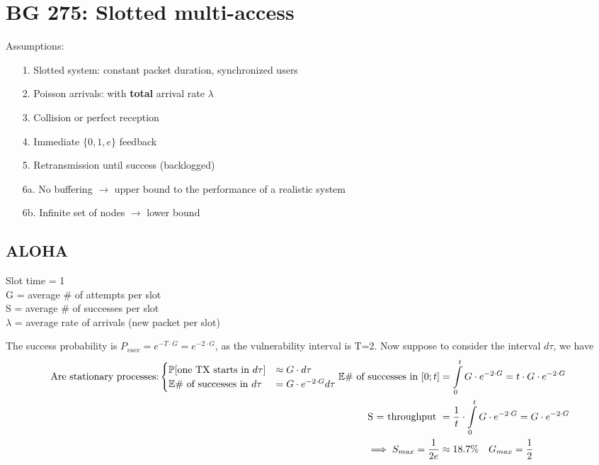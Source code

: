 \section{BG 275: Slotted multi-access}
Assumptions:
\begin{itemize}
  \item[1.] Slotted system: constant packet duration, synchronized users
  \item[2.] Poisson arrivals: with \textbf{total} arrival rate $\lambda$
  \item[3.] Collision or perfect reception
  \item[4.] Immediate $ \{ 0,1, e\}$ feedback
  \item[5.] Retransmission until success (backlogged)
  \item[6a.] No buffering $\rightarrow$ upper bound to the performance of a realistic system
  \item[6b.] Infinite set of nodes $\rightarrow$ lower bound
\end{itemize}
\subsection{ALOHA}
Slot time = 1\\
G = average $\#$ of attempts per slot\\
S = average $\#$ of successes per slot \\
$\lambda$ = average rate of arrivals (new packet per slot)

The success probability is $P_{succ} = e^{-T \cdot G} = e^{-2 \cdot G}$, as the vulnerability interval is T=2.
Now suppose to consider the interval $d\tau$, we have
\begin{equation}\begin{split}
  \text{Are stationary processes:} \begin{cases}
    \mathbb{P}[\text{one TX starts in $d\tau$}] &\approx G  \cdot d\tau\\
    \mathbb{E}{\text{\# of successes in $d\tau$}} &= G \cdot e^{-2 \cdot G} d\tau \\
  \end{cases}
  \mathbb{E}{\text{\# of successes in $[0;t]$}} &= \int\limits_0^t G \cdot e^{-2 \cdot G} = t \cdot G \cdot e^{-2 \cdot G}\\
  \text{S = throughput  }&=\frac{1}{t}\cdot  \int\limits_0^t G \cdot e^{-2 \cdot G} =  G \cdot e^{-2 \cdot G}\\
  \implies S_{max} = \frac{1}{2e}& \approx 18.7\% \quad G_{max} = \frac{1}{2}
\end{split}\end{equation}

